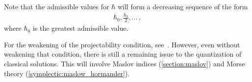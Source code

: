     \begin{remark}
        Note that the admissible values for $\hbar$ will form a decreasing sequence of the form
        \begin{gather}
            \hbar_0,\frac{\hbar_0}{2},\ldots\,,
        \end{gather}
        where $\hbar_0$ is the greatest admissible value.
    \end{remark}

    For the weakening of the projectability condition, see~\citet{bates_lectures_1997}. However, even without weakening that condition, there is still a remaining issue to the quantization of classical solutions. This will involve Maslov indices (\cref{section:maslov}) and Morse theory (\cref{symplectic:maslow_hormander}).